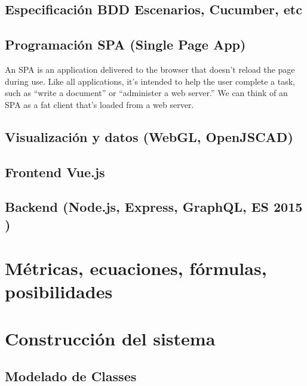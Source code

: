 \subsection{Especificación BDD Escenarios, Cucumber, etc}

\subsection{Programación SPA (Single Page App)}

\begin{displayquote}
An SPA is an application delivered to the browser that doesn’t reload the page during use. Like all applications, it’s intended to help the user complete a task, such as “write a document” or “administer a web server.” We can think of an SPA as a fat client that’s loaded from a web server. \cite{Mikowski2015}
\end{displayquote}



\subsection{Visualización y datos (WebGL, OpenJSCAD)}

\subsection{Frontend Vue.js}

\subsection{Backend (Node.js, Express, GraphQL, ES 2015 )}


\section{Métricas, ecuaciones, fórmulas, posibilidades}


\section{Construcción del sistema}

\subsection{Modelado de Classes}

